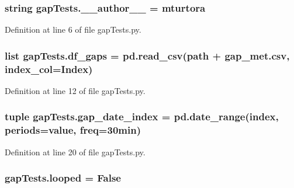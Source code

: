 \subsubsection[{\+\_\+\+\_\+author\+\_\+\+\_\+}]{\setlength{\rightskip}{0pt plus 5cm}string gap\+Tests.\+\_\+\+\_\+author\+\_\+\+\_\+ = \textquotesingle{}mturtora\textquotesingle{}}\label{namespacegap_tests_a7601773bbec9b1e705d8dcacec0cecd4}


Definition at line 6 of file gap\+Tests.\+py.

\hypertarget{namespacegap_tests_ad25db032c69bfc31e323da6fb64c808d}{}
\subsubsection[{df\+\_\+gaps}]{\setlength{\rightskip}{0pt plus 5cm}list gap\+Tests.\+df\+\_\+gaps = pd.\+read\+\_\+csv({\bf path} + \textquotesingle{}gap\+\_\+met.\+csv\textquotesingle{}, index\+\_\+col=\textquotesingle{}Index\textquotesingle{})}\label{namespacegap_tests_ad25db032c69bfc31e323da6fb64c808d}


Definition at line 12 of file gap\+Tests.\+py.

\hypertarget{namespacegap_tests_aaf8a186769b9c7f206ec21bc0c710dfc}{}
\subsubsection[{gap\+\_\+date\+\_\+index}]{\setlength{\rightskip}{0pt plus 5cm}tuple gap\+Tests.\+gap\+\_\+date\+\_\+index = pd.\+date\+\_\+range(index, periods=value, freq=\textquotesingle{}30min\textquotesingle{})}\label{namespacegap_tests_aaf8a186769b9c7f206ec21bc0c710dfc}


Definition at line 20 of file gap\+Tests.\+py.

\hypertarget{namespacegap_tests_aea36505be1591db057e57303d8fe98cf}{}
\subsubsection[{looped}]{\setlength{\rightskip}{0pt plus 5cm}gap\+Tests.\+looped = False}\label{namespacegap_tests_aea36505be1591db057e57303d8fe98cf}


